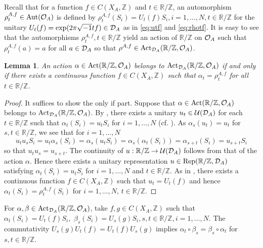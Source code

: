\documentclass[11pt]{article}
\newtheorem{lemma}[theorem]{Lemma}
\theoremstyle{plain}
\theoremstyle{definition}
\numberwithin{equation}{section}
\newcommand{\RZ}{\mathbb{R}/{\mathbb{Z}}}
\newcommand{\Z}{\mathbb{Z}}
\begin{document}
Recall that 
for a function $f\in C(X_A,\Z)$ 
and $t \in \RZ$,
an automorphism
$\rho_t^{A,f}\in{{\operatorname{Aut}}}({{\mathcal{O}}_A})$ 
is defined by 
$
\rho_t^{A,f}(S_i) = U_t(f) S_i, i=1,\dots,N, t \in \RZ
$
for the unitary
$
U_t(f) = {{\operatorname{exp}}}({2\pi \sqrt{-1} t f})\in {{\mathcal{D}}_A}
$
as in \eqref{eq:utf} and \eqref{eq:rhotf}.
It is easy to see that
the automorphisms
$\rho_t^{A,f}, t \in \RZ$ 
yield an action of 
$\RZ$ on ${{\mathcal{O}}_A}$
 such that
$\rho^{A,f}_t(a) =a$
for all $a \in {{\mathcal{D}}_A}$
 so that
$\rho^{A,f} \in {{\operatorname{Act}_{{{\mathcal{D}}_A}}(\mathbb{R}/{\mathbb{Z}},{{\mathcal{O}}_A})}}$.
\begin{lemma}
An action $\alpha \in \operatorname{Act}(\RZ,\OA)$
belongs to
 ${{\operatorname{Act}_{{{\mathcal{D}}_A}}(\mathbb{R}/{\mathbb{Z}},{{\mathcal{O}}_A})}}$ if and only if 
there exists a continuous function
$f \in C(X_A,\Z)$ 
such that 
$\alpha_t = \rho_t^{A,f}$ 
for all
$t \in \RZ$.
\end{lemma}
\begin{proof}
It suffices to show the only if part.
Suppose that $\alpha \in \operatorname{Act}(\RZ,\OA)$
belongs to ${{\operatorname{Act}_{{{\mathcal{D}}_A}}(\mathbb{R}/{\mathbb{Z}},{{\mathcal{O}}_A})}}$.
By \cite[Lemma 4.6, Corollary 4.7]{MaJOT2000},
there exists a unitary $u_t \in {{{\mathcal{U}}}}({{\mathcal{D}}_A})$
for each $t \in \RZ$
 such that
$\alpha_t(S_i) = u_t S_i$ for 
$i=1,\dots,N$ (cf. \cite{Cu2}).
As $\alpha_s(u_t)= u_t$
for $s,t \in \RZ$,
we see that for $i=1,\dots,N$
\begin{equation*}
u_t u_s S_i 
= u_t \alpha_s(S_i) 
= \alpha_s(u_t S_i) 
= \alpha_s(\alpha_t(S_i)) 
= \alpha_{s+t}(S_i) 
= u_{s+t} S_i 
\end{equation*}
so that
$u_t u_s = u_{s+t}$.
The continuity of $u:\RZ \rightarrow  {\U}(\DA)$
follows from 
that of the action $\alpha$.
Hence
there exists a unitary representation
$u \in {{\operatorname{Rep}(\mathbb{R}/{\mathbb{Z}},{{\mathcal{D}}_A})}}$
satisfying
$\alpha_t(S_i) = u_t S_i$ for 
$i=1,\dots,N$ and $t \in \RZ$.
As in \cite[Lemma 6.4]{MaPre2014},
there exists a continuous function
$f \in C(X_A,\Z)$ 
such that 
$u_t = U_t(f)$ 
and hence
$\alpha_t(S_i) = \rho_t^{A,f}(S_i)$ 
for  $i=1,\dots,N, \,t \in \RZ$.
\end{proof}
For $\alpha, \beta \in {{\operatorname{Act}_{{{\mathcal{D}}_A}}(\mathbb{R}/{\mathbb{Z}},{{\mathcal{O}}_A})}}$,
take 
$f,g \in C(X_A,\Z)$
such that
$
\alpha_t(S_i) = U_t(f)S_i,
$
$ 
\beta_s(S_i) = U_s(g)S_i,  
s,t \in \RZ, i=1,\dots,N.
$
The commutativity  
$
U_s(g)U_t(f)= U_t(f)U_s(g)
$
implies 
$\alpha_t \circ \beta_s = \beta_s \circ \alpha_t$
for $s,t \in \RZ$. 
\end{document}
